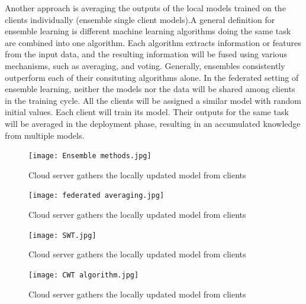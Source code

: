Another approach is averaging the outputs of the local models trained on the clients individually (ensemble single client models).A general definition for ensemble learning is different machine learning algorithms doing the same task are combined into one algorithm. Each algorithm extracts information or features from the input data, and the resulting information will be fused using various mechanisms, such as averaging, and voting. Generally, ensembles consistently outperform each of their consituting algorithms alone. In the federated setting of ensemble learning,  neither the models nor the data will be shared among clients in the training cycle. All the clients will be assigned a similar model with random initial values. Each client will train its model. Their outputs for the same task will be averaged in the deployment phase, resulting in an accumulated knowledge from multiple models.
\begin{figure}[h!]
 \centering
  \texttt{[image: Ensemble methods.jpg]}
  \caption{Cloud server gathers the locally updated model from clients }
  \label{fig:train2}
\end{figure}


\begin{figure}[h!]
 \centering
  \texttt{[image: federated averaging.jpg]}
  \caption{Cloud server gathers the locally updated model from clients }
  \label{fig:train2}
\end{figure}


\begin{figure}[h!]
 \centering
\texttt{[image: SWT.jpg]}  \caption{Cloud server gathers the locally updated model from clients }
  \label{fig:train2}
\end{figure}


\begin{figure}[h!]
 \centering
\texttt{[image: CWT algorithm.jpg]}
\caption{Cloud server gathers the locally updated model from clients }
  \label{fig:train2}
\end{figure}


        
